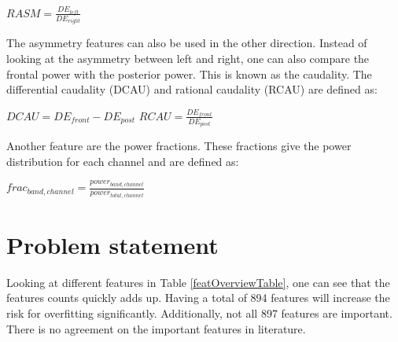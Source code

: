 \documentclass[12pt,journal,compsoc]{IEEEtran}
\newcommand{\npar}{\par \vspace{2.3ex plus 0.3ex minus 0.3ex}}
\begin{document}
\begin{center}
$RASM = \frac{DE_{left}}{DE_{right}}$
\end{center}

The asymmetry features can also be used in the other direction. Instead of looking at the asymmetry between left and right, one can also compare the frontal power with the posterior power. This is known as the caudality. The differential caudality (DCAU) and rational caudality (RCAU) are defined as:
\begin{center}
$DCAU = DE_{front} - DE_{post}$
$RCAU = \frac{DE_{front}}{DE_{post}}$
\end{center}

\npar

Another feature are the power fractions. These fractions give the power distribution for each channel and are defined as:
\begin{center}
$frac_{band,channel} = \frac{power_{band,channel}}{power_{total,channel}}$
\end{center}

\section{Problem statement}\label{problem}
Looking at different features in Table \ref{featOverviewTable}, one can see that the features counts quickly adds up. Having a total of 894 features will increase the risk for overfitting significantly. Additionally, not all 897 features are important. There is no agreement on the important features in literature. 
\end{document}
